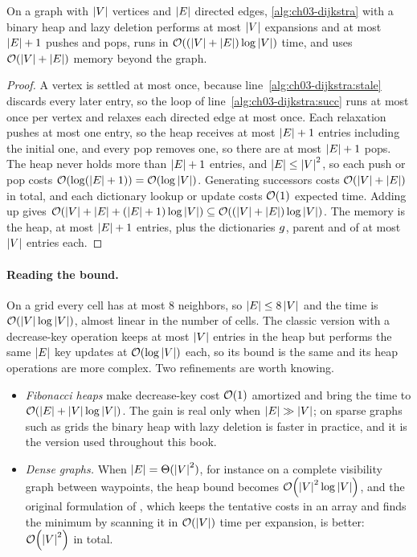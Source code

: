 \begin{theorem}
\label{thm:ch03-complexity}
%
On a graph with $\left\lvert V \right\rvert$ vertices and $\left\lvert E \right\rvert$ directed edges, \cref{alg:ch03-dijkstra} with
a binary heap and lazy deletion performs at most $\left\lvert V \right\rvert$ expansions and at most $\left\lvert E \right\rvert+1$
pushes and pops, runs in $\mathcal{O}\!\left((\left\lvert V \right\rvert+\left\lvert E \right\rvert)\log\left\lvert V \right\rvert\right)$ time, and uses
$\mathcal{O}\!\left(\left\lvert V \right\rvert+\left\lvert E \right\rvert\right)$ memory beyond the graph.
\end{theorem}
\begin{proof}
A vertex is settled at most once, because line~\ref{alg:ch03-dijkstra:stale} discards every
later entry, so the loop of line~\ref{alg:ch03-dijkstra:succ} runs at most once per vertex and
relaxes each directed edge at most once. Each relaxation pushes at most one entry, so the heap
receives at most $\left\lvert E \right\rvert+1$ entries including the initial one, and every pop removes one, so
there are at most $\left\lvert E \right\rvert+1$ pops. The heap never holds more than $\left\lvert E \right\rvert+1$ entries, and
$\left\lvert E \right\rvert\le\left\lvert V \right\rvert^2$, so each push or pop costs $\mathcal{O}\!\left(\log(\left\lvert E \right\rvert+1)\right)=\mathcal{O}\!\left(\log\left\lvert V \right\rvert\right)$.
Generating successors costs $\mathcal{O}\!\left(\left\lvert V \right\rvert+\left\lvert E \right\rvert\right)$ in total, and each dictionary lookup or
update costs $\mathcal{O}\!\left(1\right)$ expected time. Adding up gives
$\mathcal{O}\!\left(\left\lvert V \right\rvert+\left\lvert E \right\rvert+(\left\lvert E \right\rvert+1)\log\left\lvert V \right\rvert\right)\subseteq\mathcal{O}\!\left((\left\lvert V \right\rvert+\left\lvert E \right\rvert)\log\left\lvert V \right\rvert\right)$.
The memory is the heap, at most $\left\lvert E \right\rvert+1$ entries, plus the dictionaries $g$, parent
and \Closed of at most $\left\lvert V \right\rvert$ entries each.
\end{proof}

\paragraph{Reading the bound.} On a grid every cell has at most 8 neighbors, so
$\left\lvert E \right\rvert\le8\left\lvert V \right\rvert$ and the time is $\mathcal{O}\!\left(\left\lvert V \right\rvert\log\left\lvert V \right\rvert\right)$, almost linear in the number
of cells. The classic version with a decrease-key operation keeps at most $\left\lvert V \right\rvert$ entries in
the heap but performs the same $\left\lvert E \right\rvert$ key updates at $\mathcal{O}\!\left(\log\left\lvert V \right\rvert\right)$ each, so its
bound is the same and its heap operations are more complex. Two refinements are worth knowing.
\begin{itemize}
  \item \emph{Fibonacci heaps} \cite{fredman1987fibonacci} make
decrease-key cost $\mathcal{O}\!\left(1\right)$ amortized and bring the time to $\mathcal{O}\!\left(\left\lvert E \right\rvert+\left\lvert V \right\rvert\log\left\lvert V \right\rvert\right)$.
The gain is real only when $\left\lvert E \right\rvert\gg\left\lvert V \right\rvert$; on sparse graphs such as grids the binary heap
with lazy deletion is faster in practice, and it is the version used throughout this book.
  \item \emph{Dense graphs.} When
$\left\lvert E \right\rvert=\Theta(\left\lvert V \right\rvert^2)$, for instance on a complete visibility graph between waypoints, the
heap bound becomes $\mathcal{O}\!\left(\left\lvert V \right\rvert^2\log\left\lvert V \right\rvert\right)$, and the original formulation of
\textcite{dijkstra1959note}, which keeps the tentative costs in an array and finds the minimum
by scanning it in $\mathcal{O}\!\left(\left\lvert V \right\rvert\right)$ time per expansion, is better: $\mathcal{O}\!\left(\left\lvert V \right\rvert^2\right)$ in total.
\end{itemize}

